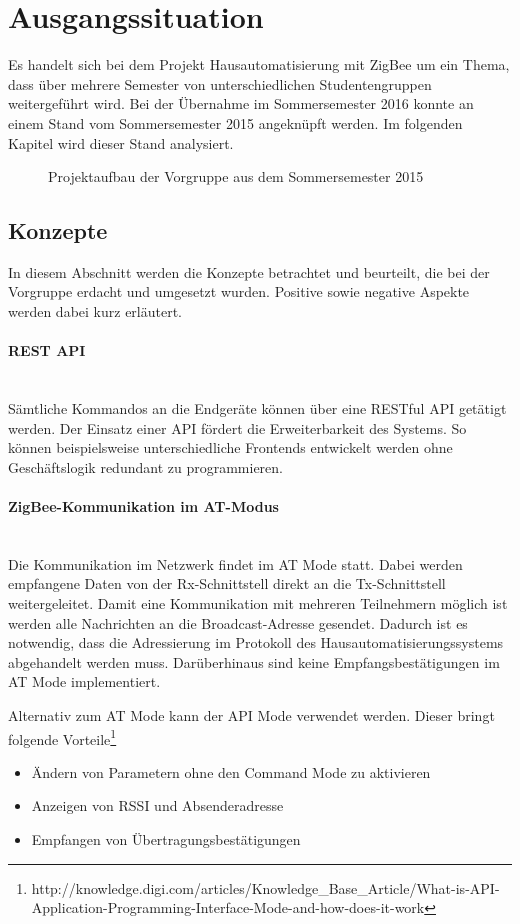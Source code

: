 \section{Ausgangssituation}
Es handelt sich bei dem Projekt Hausautomatisierung mit ZigBee um ein Thema, dass über mehrere Semester von unterschiedlichen Studentengruppen weitergeführt wird. Bei der Übernahme im Sommersemester 2016 konnte an einem Stand vom Sommersemester 2015 angeknüpft werden. Im folgenden Kapitel wird dieser Stand analysiert.
\begin{figure}[htb]
\centering
{}
\caption{Projektaufbau der Vorgruppe aus dem Sommersemester 2015}
\label{fig:Ausgang}
\end{figure}

\subsection{Konzepte}\label{Konzepte}
In diesem Abschnitt werden die Konzepte betrachtet und beurteilt, die bei der Vorgruppe erdacht und umgesetzt wurden. Positive sowie negative Aspekte werden dabei kurz erläutert.

\paragraph{REST API}\mbox{}\\
Sämtliche Kommandos an die Endgeräte können über eine RESTful API getätigt werden. Der Einsatz einer API fördert die Erweiterbarkeit des Systems. So können beispielsweise unterschiedliche Frontends entwickelt werden ohne Geschäftslogik redundant zu programmieren.

\paragraph{ZigBee-Kommunikation im AT-Modus}\mbox{}\\
Die Kommunikation im Netzwerk findet im \ac{AT Mode} statt. Dabei werden empfangene Daten von der \ac{Rx-Schnittstell} direkt an die \ac{Tx-Schnittstell} weitergeleitet. Damit eine Kommunikation mit mehreren Teilnehmern möglich ist werden alle Nachrichten an die Broadcast-Adresse gesendet. Dadurch ist es notwendig, dass die Adressierung im Protokoll des Hausautomatisierungssystems abgehandelt werden muss. Darüberhinaus sind keine Empfangsbestätigungen im \ac{AT Mode} implementiert. 

Alternativ zum \ac{AT Mode} kann der \ac{API Mode} verwendet werden. Dieser bringt folgende Vorteile\footnote{http://knowledge.digi.com/articles/Knowledge\_Base\_Article/What-is-API-Application-Programming-Interface-Mode-and-how-does-it-work}
\begin{itemize}
\item Ändern von Parametern ohne den Command Mode zu aktivieren
\item Anzeigen von RSSI und Absenderadresse
\item Empfangen von Übertragungsbestätigungen
\end{itemize}

